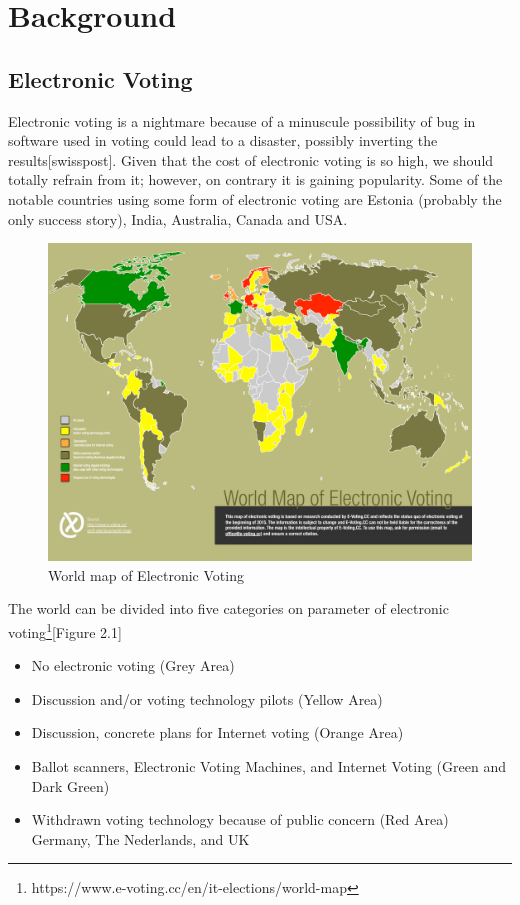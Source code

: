 \chapter{Background}
\label{cha:background}


\section{Electronic Voting}
   Electronic voting is a nightmare because of a minuscule possibility of 
   bug in software used in voting could lead to a disaster, possibly 
   inverting the results[swisspost]. Given that the cost of 
   electronic voting is 
   so high, we should totally refrain from it; however, on contrary
   it is gaining popularity. Some of the notable countries using some form
   of electronic voting are Estonia (probably the only success story), India,
   Australia, Canada and USA. 
    \begin{figure}[htb]
	\begin{center}
	\includegraphics[scale=0.5]{e-voting_worldmap_2015.pdf}
	\caption{World map of Electronic Voting}
	\end{center}
  \end{figure}  
   
  The world can be divided into five categories on 
  parameter of electronic voting\footnote{https://www.e-voting.cc/en/it-elections/world-map}[Figure 2.1]
  \begin{itemize}
  \item No electronic voting (Grey Area)
  \item Discussion and/or voting technology pilots (Yellow Area)
  \item Discussion, concrete plans for Internet voting (Orange Area)
  \item Ballot scanners, Electronic Voting Machines, and Internet Voting
        (Green and Dark Green)
  \item Withdrawn voting technology because of public concern (Red Area)
        Germany, The Nederlands, and UK  
  \end{itemize}    
  
